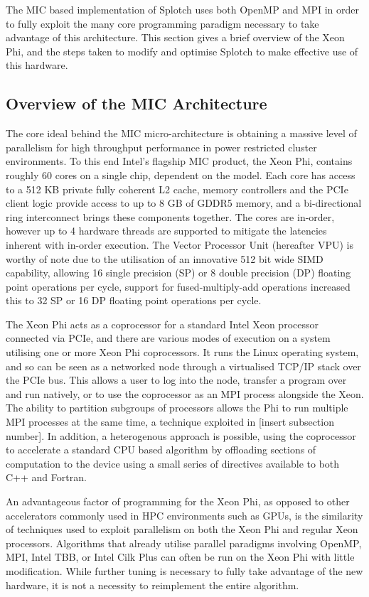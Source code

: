 \documentclass{easychair}
\begin{document}
The MIC based implementation of Splotch uses both OpenMP and MPI in order to fully exploit the many core 
programming paradigm necessary to take advantage of this architecture. This section gives a brief overview of the 
Xeon Phi, and the steps taken to modify and optimise Splotch to make effective use of this hardware.

\subsection{Overview of the MIC Architecture}
\label{sect:mic}

The core ideal behind the MIC micro-architecture is obtaining a massive level of parallelism for high throughput 
performance in power restricted cluster environments. To this end Intel's flagship MIC product, the Xeon Phi, 
contains roughly 60 cores on a single chip, dependent on the model. Each core has access to a 512 KB private 
fully coherent L2 cache, memory controllers and the PCIe client logic provide access to up to 8 GB of GDDR5 
memory, and a bi-directional ring interconnect brings these components together. The cores are in-order, however 
up to 4 hardware threads are supported to mitigate the latencies inherent with in-order execution. The Vector 
Processor Unit (hereafter VPU) is worthy of note due to the utilisation of an innovative 512 bit wide SIMD 
capability, allowing 16 single precision (SP) or 8 double precision (DP) floating point operations per cycle, 
support for fused-multiply-add operations increased this to 32 SP or 16 DP floating point operations per cycle. 

The Xeon Phi acts as a coprocessor for a standard Intel Xeon processor connected via PCIe, and there are various 
modes of execution on a system utilising one or more Xeon Phi coprocessors. It runs the Linux operating system, 
and so can be seen as a networked node through a virtualised TCP/IP stack over the PCIe bus. This allows a user 
to log into the node, transfer a program over and run natively, or to use the coprocessor as an MPI process alongside 
the Xeon. The ability to partition subgroups of processors allows the Phi to run multiple MPI processes at the same 
time, a technique exploited in [insert subsection number]. In addition, a heterogenous approach is possible, using 
the coprocessor to accelerate a standard CPU based algorithm by offloading sections of computation to the device using 
a small series of directives available to both C++ and Fortran. 

An advantageous factor of programming for the Xeon Phi, as opposed to other accelerators commonly used in HPC 
environments such as GPUs, is the similarity of techniques used to exploit parallelism on both the Xeon Phi and 
regular Xeon processors. Algorithms that already utilise parallel paradigms involving OpenMP, MPI, Intel TBB, or 
Intel Cilk Plus can often be run on the Xeon Phi with little modification. While further tuning is necessary to 
fully take advantage of the new hardware, it is not a necessity to reimplement the entire algorithm.   
\end{document}
